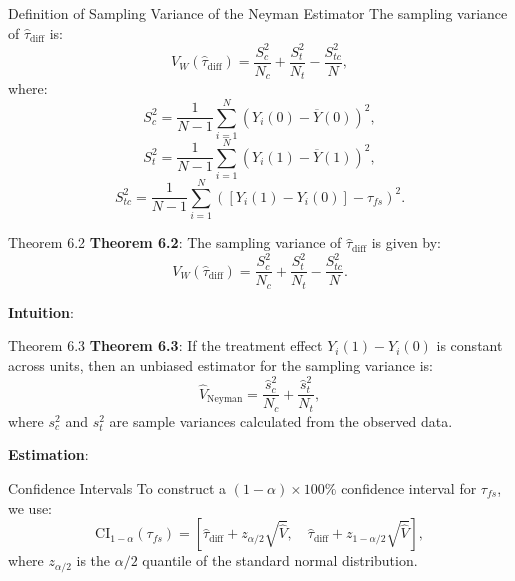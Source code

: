 \documentclass[xcolor=svgnames,t]{beamer}
\begin{document}
    \begin{frame}{Definition of Sampling Variance of the Neyman Estimator}
    The sampling variance of $\hat{\tau}_{\text{diff}}$ is:
    \[
    V_W\left( \hat{\tau}_{\text{diff}} \right) = \frac{S_c^2}{N_c} + \frac{S_t^2}{N_t} - \frac{S_{tc}^2}{N},
    \]
    where:
    \[
    S_c^2 = \frac{1}{N - 1} \sum_{i=1}^{N} \left( Y_i(0) - \overline{Y}(0) \right)^2,
    \]
    \[
    S_t^2 = \frac{1}{N - 1} \sum_{i=1}^{N} \left( Y_i(1) - \overline{Y}(1) \right)^2,
    \]
    \[
    S_{tc}^2 = \frac{1}{N - 1} \sum_{i=1}^{N} \left( [Y_i(1) - Y_i(0)] - \tau_{fs} \right)^2.
    \]
    
    \vspace{1.5cm} %
    
    \end{frame}
    
    \begin{frame}{Theorem 6.2}
    \textbf{Theorem 6.2}: The sampling variance of $\hat{\tau}_{\text{diff}}$ is given by:
    \[
    V_W\left( \hat{\tau}_{\text{diff}} \right) = \frac{S_c^2}{N_c} + \frac{S_t^2}{N_t} - \frac{S_{tc}^2}{N}.
    \]
    
    \vspace{0.5cm} %
    
    \textbf{Intuition}:
    
    \vspace{4cm} %
    
    \end{frame}
    
    \begin{frame}{Theorem 6.3}
    \textbf{Theorem 6.3}: If the treatment effect $Y_i(1) - Y_i(0)$ is constant across units, then an unbiased estimator for the sampling variance is:
    \[
    \hat{V}_{\text{Neyman}} = \frac{\hat{s}_c^2}{N_c} + \frac{\hat{s}_t^2}{N_t},
    \]
    where $s_c^2$ and $s_t^2$ are sample variances calculated from the observed data.
    
    \vspace{0.5cm} %
    
    \textbf{Estimation}:
    
    \vspace{4cm} %
    
    \end{frame}
    
    \begin{frame}{Confidence Intervals}
    To construct a $(1 - \alpha) \times 100\%$ confidence interval for $\tau_{fs}$, we use:
    \[
    \text{CI}_{1 - \alpha}(\tau_{fs}) = \left[ \hat{\tau}_{\text{diff}} + z_{\alpha/2} \sqrt{\hat{V}}, \quad \hat{\tau}_{\text{diff}} + z_{1 - \alpha/2} \sqrt{\hat{V}} \right],
    \]
    where $z_{\alpha/2}$ is the $\alpha/2$ quantile of the standard normal distribution.
    
    \vspace{2cm} %
    
    \end{frame}
    
\end{document}
